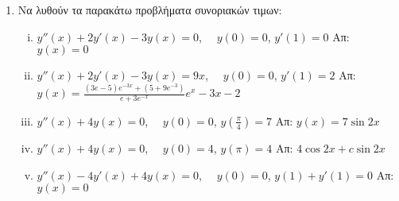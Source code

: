 


\thispagestyle{empty}



\begin{center}
\end{center}


\vspace{\baselineskip}


\begin{enumerate}
  \item Να λυθούν τα παρακάτω προβλήματα συνοριακών τιμων:
  \begin{enumerate}[i)]
    \item $y''(x)+2y'(x)-3y(x)=0$, $\quad y(0)=0$, $y'(1)=0$ \hfill Απ: $y(x)=0$
    \item $y''(x)+2y'(x)-3y(x)=9x$, $\quad y(0)=0$, $y'(1)=2$ \hfill Απ: $\scriptstyle{y(x)=\frac{(3e-5)e^{-3x}+(5+9e^{-3})}{e+3e^{-x}}e^{x}-3x-2}$
    \item $y''(x)+4y(x)=0$, $\quad y(0)=0$, $y(\frac{\pi}{4})=7$ \hfill Απ: $y(x)=7\sin 2x$
    \item $y''(x)+4y(x)=0$, $\quad y(0)=4$, $y(\pi)=4$ \hfill Απ: $4\cos 2x+c\sin 2x$
    \item $y''(x)-4y'(x)+4y(x)=0$, $\quad y(0)=0$, $y(1)+y'(1)=0$ \hfill Απ: $y(x)=0$
  \end{enumerate}


\end{enumerate}
